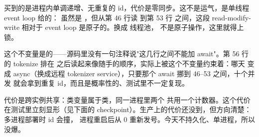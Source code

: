 买到的是进程内单调递增、无重复的 id，代价是零同步。这不是运气，是单线程 event loop 给的：
 虽然是 ，但从第 46 行读  到第 53 行 
之间，这段 read-modify-write 相对于 event loop 是原子的。换成
线程池，\code{+=} 不是原子操作，这里就得上锁。

这个不变量是的——源码里没有一句注释说"这几行之间不能加 await"。第 56 行的 tokenize
排在  之后读起来像随手的顺序，实际上被这个不变量约束着：哪天
 变成 async（换成远程 tokenizer service），只要那个 await 挪到
46--53 之间，十个并发  就会拿到重复 id，而且是概率性的、测试里不一定复现。

代价是跨实例共享：类变量属于类，同一进程里两个  共用一个计数器。这个代价
在测试里立刻显形（见下面的 checkpoint）。生产上的代价还没到，但方向清楚：多进程部署时 id 会撞，
进程重启后从 0 重新发号。今天不持久化、单进程，所以没爆。

